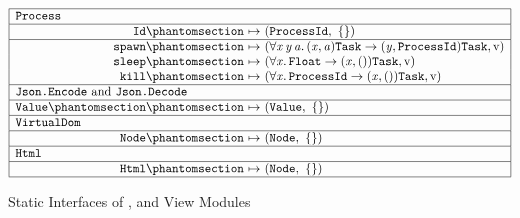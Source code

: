 \begin{figure}[htbp]
\centering
\small
\[
\begin{array}{|r@{\ }c@{\ }l|}
\hline
\multicolumn{3}{|l|}{\kw{Process}}\\
\hline
\kw{Id}\citelabel{b:Process.Id} & \mapsto & (\sbtProcessId,\ \emptymap)\\
\hline
\kw{spawn}\citelabel{b:Process.spawn} & \mapsto & (\forall\mv{x}\,\mv{y}\,\mv{a}.\,(\mv{x}, \mv{a})\sbtTask \rightarrow (\mv{y}, \sbtProcessId)\sbtTask, \isv)\\
\kw{sleep}\citelabel{b:Process.sleep} & \mapsto & (\forall\mv{x}.\,\tFloat \rightarrow (\mv{x}, \tunit)\sbtTask, \isv)\\
\kw{kill}\citelabel{b:Process.kill} & \mapsto & (\forall\mv{x}.\,\sbtProcessId \rightarrow (\mv{x}, \tunit)\sbtTask, \isv)\\
\hline
\multicolumn{3}{|l|}{\kw{Json.Encode}\ \text{and}\ \kw{Json.Decode}}\\
\hline
\kw{Value}\citelabel{b:Json.Encode.Value}\citelabel{b:Json.Decode.Value} & \mapsto & (\tValue,\ \emptymap)\\
\hline
\multicolumn{3}{|l|}{\kw{VirtualDom}}\\
\hline
\kw{Node}\citelabel{b:VirtualDom.Node} & \mapsto & (\sbtNode,\ \emptymap)\\
\hline
\multicolumn{3}{|l|}{\kw{Html}}\\
\hline
\kw{Html}\citelabel{b:Html.Html} & \mapsto & (\sbtNode,\ \emptymap)\\
\hline
\end{array}
\]
\caption{Static Interfaces of ,  and View Modules}\label{fig:static-basis-effects}
\end{figure}


